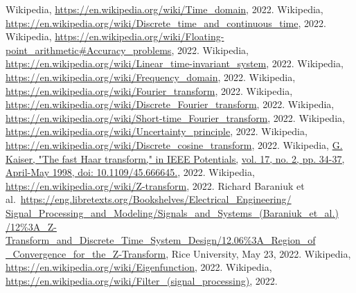 \clearpage
{}
\begin{thebibliography}{9}
        \footnotesize{
         Wikipedia, \underline{https://en.wikipedia.org/wiki/Time\_domain}, 2022.
         Wikipedia, \underline{https://en.wikipedia.org/wiki/Discrete\_time\_and\_continuous\_time}, 2022.
         Wikipedia, \underline{https://en.wikipedia.org/wiki/Floating-point\_arithmetic\#Accuracy\_problems}, 2022.
         Wikipedia, \underline{https://en.wikipedia.org/wiki/Linear\_time-invariant\_system}, 2022.
         Wikipedia, \underline{https://en.wikipedia.org/wiki/Frequency\_domain}, 2022.
         Wikipedia, \underline{https://en.wikipedia.org/wiki/Fourier\_transform}, 2022.
         Wikipedia, \underline{https://en.wikipedia.org/wiki/Discrete\_Fourier\_transform}, 2022.
         Wikipedia, \underline{https://en.wikipedia.org/wiki/Short-time\_Fourier\_transform}, 2022.
         Wikipedia, \underline{https://en.wikipedia.org/wiki/Uncertainty\_principle}, 2022.
         Wikipedia, \underline{https://en.wikipedia.org/wiki/Discrete\_cosine\_transform}, 2022.
         Wikipedia, \underline{G. Kaiser, "The fast Haar transform," in IEEE Potentials,} \underline{vol. 17, no. 2, pp. 34-37, April-May 1998, doi: 10.1109/45.666645.}, 2022.
         Wikipedia, \underline{https://en.wikipedia.org/wiki/Z-transform}, 2022.
         Richard Baraniuk et al.\ \underline{https://eng.libretexts.org/Bookshelves/Electrical\_Engineering/} \underline{Signal\_Processing\_and\_Modeling/Signals\_and\_Systems\_(Baraniuk\_et\_al.)} \underline{/12\%3A\_Z-Transform\_and\_Discrete\_Time\_System\_Design/12.06\%3A\_Region\_of} \underline{\_Convergence\_for\_the\_Z-Transform}, Rice University, May 23, 2022.
         Wikipedia, \underline{https://en.wikipedia.org/wiki/Eigenfunction}, 2022.
         Wikipedia, \underline{https://en.wikipedia.org/wiki/Filter\_(signal\_processing)}, 2022.
        }
\end{thebibliography}

